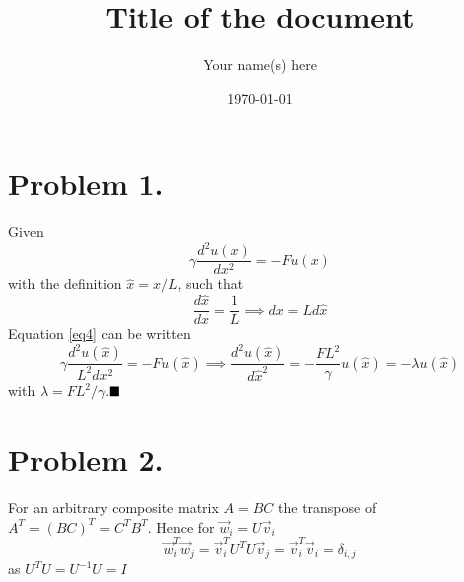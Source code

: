 \documentclass[english,notitlepage]{revtex4-1}  %
\begin{document}
\title{Title of the document}      %
\author{Your name(s) here}          %
\date{\today}                             %
\noaffiliation                            %


\maketitle 
    

\section*{Problem 1.}
    Given
    \begin{equation}
            \gamma \frac{d^2 u(x)}{d x^2}
        =   -Fu(x)
        \label{eq4}
    \end{equation}
    with the definition $\hat{x} = x/L$, such that
    \begin{equation*}
            \frac{d\hat{x}}{d x}
        =   \frac{1}{L}
        \implies 
            dx
        =   L d\hat{x}
    \end{equation*}
    Equation \ref{eq4} can be written
    \begin{equation*}
            \gamma \frac{d^2 u(\hat{x})}{L^2 dx^2}
        =   -Fu(\hat{x})
        \implies
            \frac{d^2 u(\hat{x})}{d \hat{x}^2}
        =   -\frac{FL^2}{\gamma}u(\hat{x})
        =   -\lambda u(\hat{x})
    \end{equation*}
    with $\lambda = FL^2/\gamma$.$\hfill\blacksquare$


\section*{Problem 2.}
    For an arbitrary composite matrix $A = BC$ the transpose of $A^T = (BC)^T = C^TB^T$.
    Hence for $\vec{w}_i = U\vec{v}_i$
    \begin{equation*}
            \vec{w}^T_i\vec{w}_j
        =   \vec{v}^T_iU^TU\vec{v}_j
        =   \vec{v}^T_i\vec{v}_i
        =   \delta_{i,j}
    \end{equation*}
    as $U^TU = U^{-1}U = I$

   
\end{document}
